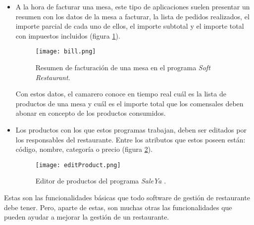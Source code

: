 \begin{itemize}
    \item A la hora de facturar una mesa, este tipo de aplicaciones suelen
    presentar un resumen con los datos de la mesa a facturar, la lista de
    pedidos realizados, el importe parcial de cada uno de ellos, el importe
    subtotal y el importe total con impuestos incluidos (figura
    \ref{fig:bill}).

    \begin{figure}[!h]
      \begin{center}
        \texttt{[image: bill.png]}
        \caption{Resumen de facturación de una mesa en el programa
        \emph{Soft Restaurant}\cite{bib:softRestaurant}.}
        \label{fig:bill}
      \end{center}
    \end{figure}

    Con estos datos, el camarero conoce en tiempo real cuál es la lista de
    productos de una mesa y cuál es el importe total que los comensales deben
    abonar en concepto de los productos consumidos.

    \item Los productos con los que estos programas trabajan, deben ser
    editados por los responsables del restaurante. Entre los atributos que
    estos poseen están: código, nombre, categoría o precio (figura
    \ref{fig:editProduct}).

    \begin{figure}[!h]
      \begin{center}
        \texttt{[image: editProduct.png]}
        \caption{Editor de productos del programa \emph{SaleYa}
        \cite{bib:saleYa}.}
        \label{fig:editProduct}
      \end{center}
    \end{figure}
    \end{itemize}

    Estas son las funcionalidades básicas que todo software de 
    gestión de restaurante debe tener. Pero, aparte de estas, son muchas otras 
    las funcionalidades que pueden ayudar a mejorar la gestión de un 
    restaurante.

